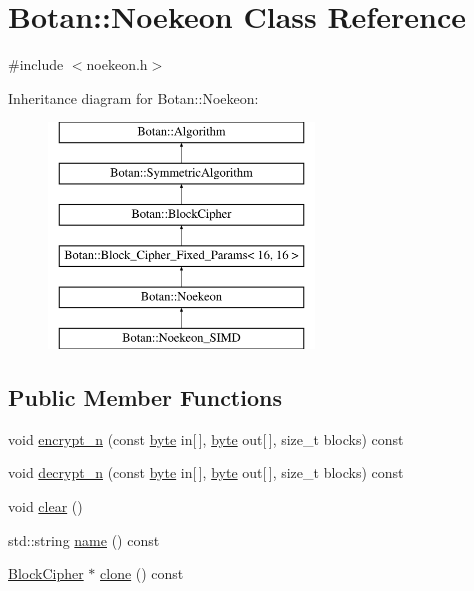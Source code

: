 \hypertarget{classBotan_1_1Noekeon}{\section{Botan\-:\-:Noekeon Class Reference}
\label{classBotan_1_1Noekeon}
}


{\ttfamily \#include $<$noekeon.\-h$>$}

Inheritance diagram for Botan\-:\-:Noekeon\-:\begin{figure}[H]
\begin{center}
\leavevmode
\includegraphics[height=6.000000cm]{classBotan_1_1Noekeon}
\end{center}
\end{figure}
\subsection*{Public Member Functions}
\begin{DoxyCompactItemize}
\item 
void \hyperlink{classBotan_1_1Noekeon_a83f8e130c7d9acd162ea8c008f7c96f1}{encrypt\-\_\-n} (const \hyperlink{namespaceBotan_a7d793989d801281df48c6b19616b8b84}{byte} in\mbox{[}$\,$\mbox{]}, \hyperlink{namespaceBotan_a7d793989d801281df48c6b19616b8b84}{byte} out\mbox{[}$\,$\mbox{]}, size\-\_\-t blocks) const 
\item 
void \hyperlink{classBotan_1_1Noekeon_af2fc659c44527d992b3994ba35f4e7a1}{decrypt\-\_\-n} (const \hyperlink{namespaceBotan_a7d793989d801281df48c6b19616b8b84}{byte} in\mbox{[}$\,$\mbox{]}, \hyperlink{namespaceBotan_a7d793989d801281df48c6b19616b8b84}{byte} out\mbox{[}$\,$\mbox{]}, size\-\_\-t blocks) const 
\item 
void \hyperlink{classBotan_1_1Noekeon_a7a6559a0c21dd7e107d22f4947bb22bd}{clear} ()
\item 
std\-::string \hyperlink{classBotan_1_1Noekeon_a7c4a5c2eb2c4b5a4774836e0a7c4446c}{name} () const 
\item 
\hyperlink{classBotan_1_1BlockCipher}{Block\-Cipher} $\ast$ \hyperlink{classBotan_1_1Noekeon_a4efa55d5102e5c3940182d61c5ceed55}{clone} () const 
\end{DoxyCompactItemize}
